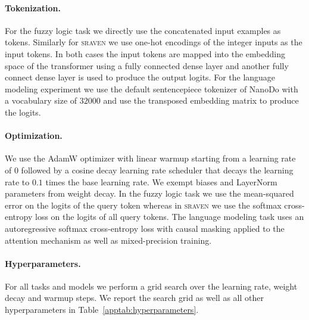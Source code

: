 \documentclass{article} \usepackage{iclr2025,times}
\begin{document}
\paragraph{Tokenization.}
For the fuzzy logic task we directly use the concatenated input examples as tokens.
Similarly for \textsc{sraven} we use one-hot encodings of the integer inputs as the input tokens.
In both cases the input tokens are mapped into the embedding space of the transformer using a fully connected dense layer and another fully connect dense layer is used to produce the output logits.
For the language modeling experiment we use the default sentencepiece tokenizer \citep{kudo_sentencepiece_2018} of NanoDo \citep{liu_nanodo_2024} with a vocabulary size of $32000$ and use the transposed embedding matrix to produce the logits.

\paragraph{Optimization.}
We use the AdamW optimizer \citep{loshchilov_decoupled_2019} with linear warmup starting from a learning rate of $0$ followed by a cosine decay learning rate scheduler \citep{loshchilov_sgdr_2017} that decays the learning rate to $0.1$ times the base learning rate.
We exempt biases and LayerNorm parameters from weight decay.
In the fuzzy logic task we use the mean-squared error on the logits of the query token whereas in \textsc{sraven} we use the softmax cross-entropy loss on the logits of all query tokens.
The language modeling task uses an autoregressive softmax cross-entropy loss with causal masking applied to the attention mechanism as well as mixed-precision training.

\paragraph{Hyperparameters.}
For all tasks and models we perform a grid search over the learning rate, weight decay and warmup steps.
We report the search grid as well as all other hyperparameters in Table~\ref{apptab:hyperparameters}.
\end{document}
